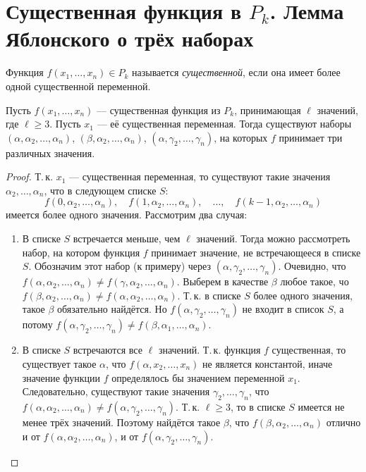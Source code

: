 \section{Существенная функция в $P_k$. Лемма Яблонского о трёх наборах}

\begin{definition}
    Функция $f(x_1, \ldots, x_n) \in P_k$ называется \textit{существенной}, если она имеет более одной существенной переменной.
\end{definition}

\begin{lemma}
    Пусть $f(x_1, \ldots, x_n)$ --- существенная функция из $P_k$, принимающая $\ell$ значений, где $\ell \geqslant 3$. Пусть $x_1$ --- её существенная переменная. Тогда существуют наборы $(\alpha, \alpha_2, \ldots, \alpha_n)$, $(\beta, \alpha_2, \ldots, \alpha_n)$, $(\alpha, \gamma_2, \ldots, \gamma_n)$, на которых $f$ принимает три различных значения.
\end{lemma}

\begin{proof}
    Т.\,к. $x_1$ --- существенная переменная, то существуют такие значения $\alpha_2, \ldots, \alpha_n$, что в следующем списке $S$:
    \[
        f(0, \alpha_2, \ldots, \alpha_n),\quad f(1, \alpha_2, \ldots, \alpha_n),\quad \ldots,\quad f(k - 1, \alpha_2, \ldots, \alpha_n)
    \]
    имеется более одного значения. Рассмотрим два случая:
    \begin{enumerate}
        \item В списке $S$ встречается меньше, чем $\ell$ значений. Тогда можно рассмотреть набор, на котором функция $f$ принимает значение, не встречающееся в списке $S$. Обозначим этот набор (к примеру) через $(\alpha, \gamma_2, \ldots, \gamma_n)$. Очевидно, что $f(\alpha, \alpha_2, \ldots, \alpha_n) \ne f(\gamma, \alpha_2, \ldots, \alpha_n)$. Выберем в качестве $\beta$ любое такое, чо $f(\beta, \alpha_2, \ldots, \alpha_n) \ne f(\alpha, \alpha_2, \ldots, \alpha_n)$. Т.\,к. в списке $S$ более одного значения, такое $\beta$ обязательно найдётся. Но $f(\alpha, \gamma_2, \ldots, \gamma_n)$ не входит в список $S$, а потому $f(\alpha, \gamma_2, \ldots, \gamma_n) \ne f(\beta, \alpha_1, \ldots, \alpha_n)$.
        \item В списке $S$ встречаются все $\ell$ значений. Т.\,к. функция $f$ существенная, то существует такое $\alpha$, что $f(\alpha, x_2, \ldots, x_n)$ не является константой, иначе значение функции $f$ определялось бы значением переменной $x_1$. Следовательно, существуют такие значения $\gamma_2, \ldots, \gamma_n$, что $f(\alpha, \alpha_2, \ldots, \alpha_n) \ne f(\alpha, \gamma_2, \ldots, \gamma_n)$. Т.\,к. $\ell \geqslant 3$, то в списке $S$ имеется не менее трёх значений. Поэтому найдётся такое $\beta$, что $f(\beta, \alpha_2, \ldots, \alpha_n)$ отлично и от $f(\alpha, \alpha_2, \ldots, \alpha_n)$, и от $f(\alpha, \gamma_2, \ldots, \gamma_n)$.
    \end{enumerate}
\end{proof}

